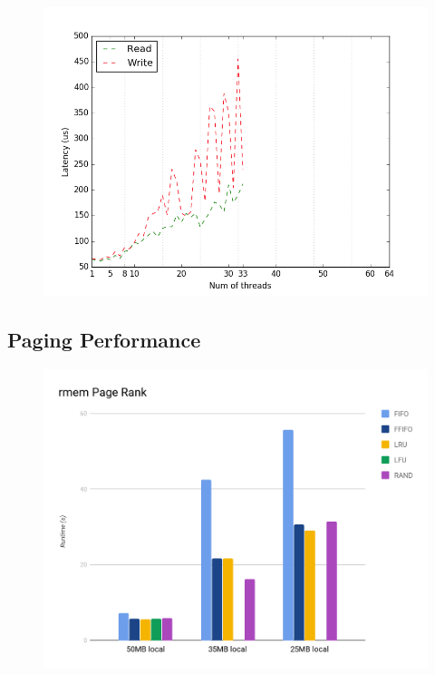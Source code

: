 \begin{figure}[H]
    \includegraphics[width=\columnwidth]{fig/latencyVsManyThreads}
    \caption{\todo{}}
    \label{fig:latenctVsManyThreads}
\end{figure}

\subsection{Paging Performance}

\begin{figure}[H]
    \includegraphics[width=\columnwidth]{fig/policyPerformance}
    \caption{\todo{}}
    \label{fig:policyPerformance}
\end{figure}

